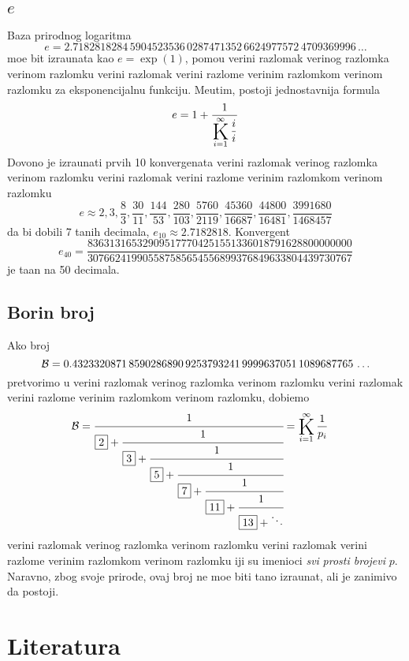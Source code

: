 \documentclass[12pt, twoside, a4paper]{article}
\def\vr#1{\ifcase#1\relax\or
  ve\-ri{\zv}\-ni raz\-lo\-mak\or
  ve\-ri{\zv}\-nog raz\-lom\-ka\or
  ve\-ri{\zv}\-nom raz\-lom\-ku\or
  ve\-ri{\zv}\-ni raz\-lo\-mak\or
  ve\-ri{\zv}\-ni raz\-lom\-{\cv}e\or
  ve\-ri{\zv}\-nim raz\-lom\-kom\or
  ve\-ri{\zv}\-nom raz\-lom\-ku\fi}
\begin{document}
\subsection{$e$}

\def\raz#1/#2/{\frac{#1}{#2}}

Baza prirodnog logaritma
$$
e=2.
7182818284\,
5904523536\,
0287471352\,
6624977572\,
4709369996\,
\ldots
$$
mo{\zv}e bit izra{\cv}unata kao $e=\exp(1)$, pomo{\cc}u \vr2 za eksponencijalnu funkciju. 
Me{\dj}utim, postoji jednostavnija formula
$$
e=1+\frac{1}{\Kinf ii}
$$
Dovo{\lj}no je izra{\cv}unati prvih 10 konvergenata \vr2
$$
e\approx
2, 3, \raz8/3/, \raz30/11/, \raz144/53/, \raz280/103/, \raz5760/2119/, \raz45360/16687/, 
\raz44800/16481/, \raz3991680/1468457/
$$
da bi dobili 7 ta{\cv}nih decimala, $e_{10}\approx2.7182818$.
Konvergent 
$$e_{40}= 
\raz836313165329095177704251551336018791628800000000/
307662419905587585654556899376849633804439730767/
$$
je ta{\cv}an na 50 decimala.

\subsection{Borin broj}

\def\ofrac#1{\cfrac{1}{#1}}
\def\B{{\cal B}}
Ako broj
$$
\B=0.
4323320871\,
8590286890\,
9253793241\,
9999637051\,
1089687765\,
\ldots
$$
pretvorimo u \vr1, dobi{\cc}emo
\begin{align*}
\B &= \ofrac{\fbox2+\ofrac{\fbox3+\ofrac{\fbox5+\ofrac{\fbox7+\ofrac{\fbox{11}+\ofrac{\fbox{13}+\ddots}}}}}}
=\Kinf1{p_i}
\end{align*}
\vr1 {\cv}iji su imenioci {\it svi} {\sl prosti brojevi} $p$.
Naravno, zbog svoje prirode, ovaj broj ne mo{\zv}e biti ta{\cv}no izra{\cv}unat,
ali je zanim{\lj}ivo da postoji.


\section{Literatura}


\end{document}
